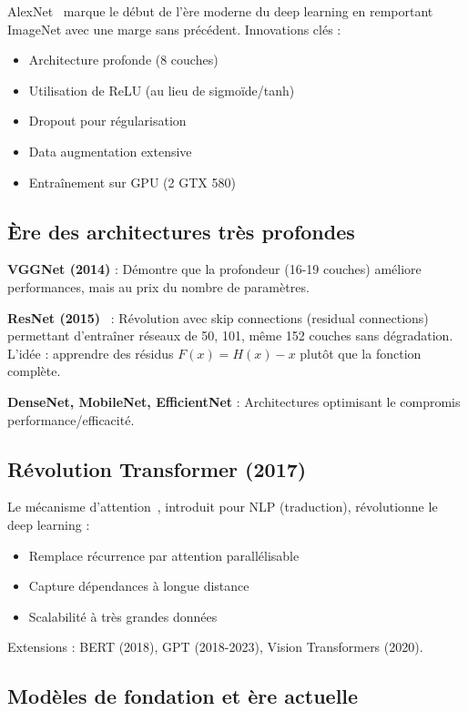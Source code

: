 AlexNet~\cite{Krizhevsky2012} marque le début de l'ère moderne du deep learning en remportant ImageNet avec une marge sans précédent. Innovations clés :
\begin{itemize}
    \item Architecture profonde (8 couches)
    \item Utilisation de ReLU (au lieu de sigmoïde/tanh)
    \item Dropout pour régularisation
    \item Data augmentation extensive
    \item Entraînement sur GPU (2 GTX 580)
\end{itemize}

\subsection{Ère des architectures très profondes}

\textbf{VGGNet (2014)} : Démontre que la profondeur (16-19 couches) améliore performances, mais au prix du nombre de paramètres.

\textbf{ResNet (2015)}~\cite{He2016} : Révolution avec skip connections (residual connections) permettant d'entraîner réseaux de 50, 101, même 152 couches sans dégradation. L'idée : apprendre des résidus $F(x) = H(x) - x$ plutôt que la fonction complète.

\textbf{DenseNet, MobileNet, EfficientNet} : Architectures optimisant le compromis performance/efficacité.

\subsection{Révolution Transformer (2017)}

Le mécanisme d'attention~\cite{Vaswani2017}, introduit pour NLP (traduction), révolutionne le deep learning :
\begin{itemize}
    \item Remplace récurrence par attention parallélisable
    \item Capture dépendances à longue distance
    \item Scalabilité à très grandes données
\end{itemize}

Extensions : BERT (2018), GPT (2018-2023), Vision Transformers (2020).

\subsection{Modèles de fondation et ère actuelle}

